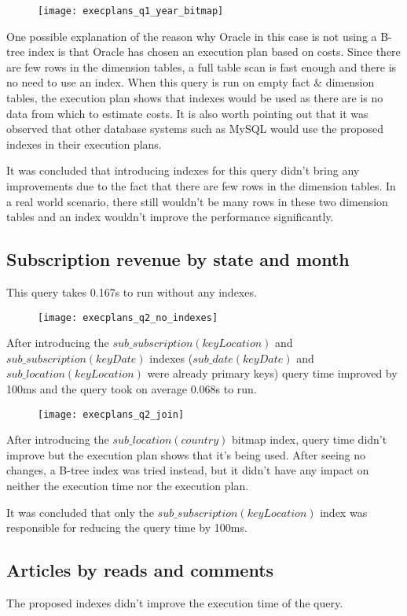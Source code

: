 \begin{figure}[!htp]
\begin{center}
  \texttt{[image: execplans\_q1\_year\_bitmap]}
\end{center}
\end{figure}

One possible explanation of the reason why Oracle in this case is not using a B-tree index is that Oracle has chosen an execution plan based on costs. Since there are few rows in the dimension tables, a full table scan is fast enough and there is no need to use an index. When this query is run on empty fact \& dimension tables, the execution plan shows that indexes would be used as there are is no data from which to estimate costs. It is also worth pointing out that it was observed that other database systems such as MySQL would use the proposed indexes in their execution plans.

It was concluded that introducing indexes for this query didn't bring any improvements due to the fact that there are few rows in the dimension tables. In a real world scenario, there still wouldn't be many rows in these two dimension tables and an index wouldn't improve the performance significantly.

\subsection*{Subscription revenue by state and month} 
This query takes 0.167s to run without any indexes.

\begin{figure}[!htp]
\begin{center}
  \texttt{[image: execplans\_q2\_no\_indexes]}
\end{center}
\end{figure}

After introducing the $sub\_subscription(keyLocation)$ and $sub\_subscription(keyDate)$ indexes ($sub\_date(keyDate)$ and $sub\_location(keyLocation)$ were already primary keys) query time improved by 100ms and the query took on average 0.068s to run.

\begin{figure}[!htp]
\begin{center}
  \texttt{[image: execplans\_q2\_join]}
\end{center}
\end{figure}

After introducing the $sub\_location(country)$ bitmap index, query time didn't improve but the execution plan shows that it's being used. After seeing no changes, a B-tree index was tried instead, but it didn't have any impact on neither the execution time nor the execution plan.

It was concluded that only the $sub\_subscription(keyLocation)$ index was responsible for reducing the query time by 100ms.

\subsection*{Articles by reads and comments}

The proposed indexes didn't improve the execution time of the query.

